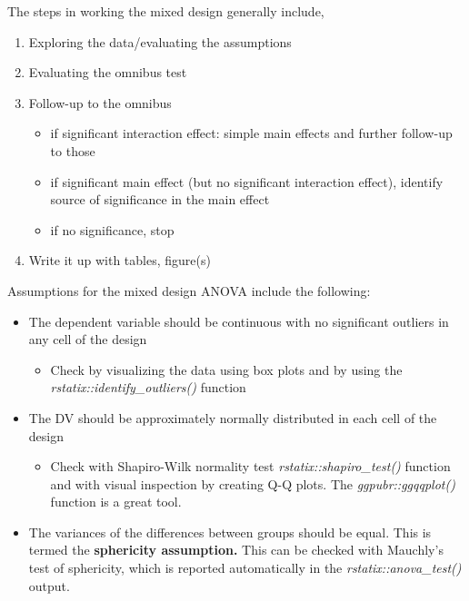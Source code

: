\documentclass[
  11pt,
]{book}
\providecommand{\tightlist}{%
  \setlength{\itemsep}{0pt}\setlength{\parskip}{0pt}}
\begin{document}
The steps in working the mixed design generally include,

\begin{enumerate}
\def\labelenumi{\arabic{enumi}.}
\tightlist
\item
  Exploring the data/evaluating the assumptions
\item
  Evaluating the omnibus test
\item
  Follow-up to the omnibus

  \begin{itemize}
  \tightlist
  \item
    if significant interaction effect: simple main effects and further follow-up to those
  \item
    if significant main effect (but no significant interaction effect), identify source of significance in the main effect
  \item
    if no significance, stop
  \end{itemize}
\item
  Write it up with tables, figure(s)
\end{enumerate}

Assumptions for the mixed design ANOVA include the following:

\begin{itemize}
\tightlist
\item
  The dependent variable should be continuous with no significant outliers in any cell of the design

  \begin{itemize}
  \tightlist
  \item
    Check by visualizing the data using box plots and by using the \emph{rstatix::identify\_outliers()} function
  \end{itemize}
\item
  The DV should be approximately normally distributed in each cell of the design

  \begin{itemize}
  \tightlist
  \item
    Check with Shapiro-Wilk normality test \emph{rstatix::shapiro\_test()} function and with visual inspection by creating Q-Q plots. The \emph{ggpubr::ggqqplot()} function is a great tool.
  \end{itemize}
\item
  The variances of the differences between groups should be equal. This is termed the \textbf{sphericity assumption.} This can be checked with Mauchly's test of sphericity, which is reported automatically in the \emph{rstatix::anova\_test()} output.
\end{itemize}
\end{document}
